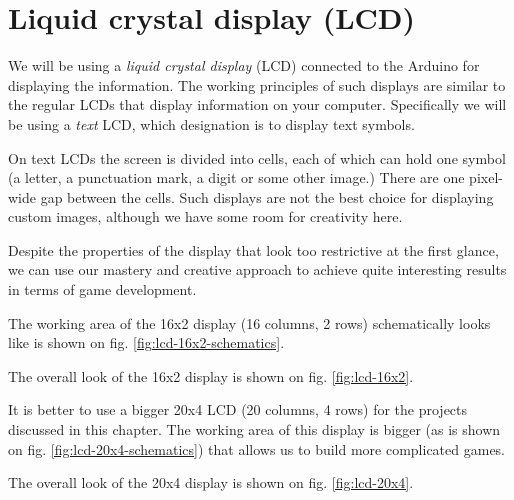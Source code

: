 \documentclass[../sparc.tex]{subfiles}
\begin{document}
\section{Liquid crystal display (LCD)}

We will be using a \emph{liquid crystal display} (LCD) connected to the Arduino
for displaying the information.  The working principles of such displays are
similar to the regular LCDs that display information on your computer.
Specifically we will be using a \emph{text} LCD, which designation is to display
text symbols.

On text LCDs the screen is divided into cells, each of which can hold one symbol
(a letter, a punctuation mark, a digit or some other image.)  There are one
pixel-wide gap between the cells.  Such displays are not the best choice for
displaying custom images, although we have some room for creativity here.

Despite the properties of the display that look too restrictive at the first
glance, we can use our mastery and creative approach to achieve quite
interesting results in terms of game development.

The working area of the 16x2 display (16 columns, 2 rows) schematically looks
like is shown on fig. \ref{fig:lcd-16x2-schematics}.


The overall look of the 16x2 display is shown on fig. \ref{fig:lcd-16x2}.


It is better to use a bigger 20x4 LCD (20 columns, 4 rows) for the projects
discussed in this chapter.  The working area of this display is bigger (as is
shown on fig. \ref{fig:lcd-20x4-schematics}) that allows us to build more
complicated games.


The overall look of the 20x4 display is shown on fig. \ref{fig:lcd-20x4}.

\end{document}
